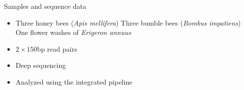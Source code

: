 \documentclass{beamer}
\begin{document}
\begin{frame}{Samples and sequence data}
    \begin{itemize}
        \item Three honey bees (\textit{Apis mellifera})
        \newline Three bumble bees (\textit{Bombus impatiens})
        \newline One flower washes of \textit{Erigeron annuus}
        \item $2 \times 150$bp read pairs
        \item Deep sequencing
        \item Analyzed using the integrated pipeline
    \end{itemize}
\end{frame}
\end{document}
